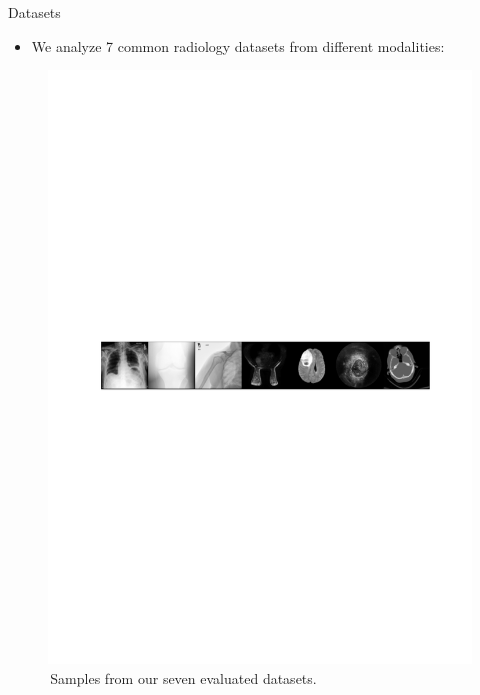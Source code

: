 \documentclass[final,hyperref={pdfpagelabels=false}]{beamer}
\begin{document}
\begin{frame}[t]
\begin{columns}[t]
\begin{column}{.47\textwidth}
\begin{block}{Datasets}
\begin{itemize}
\item We analyze 7 common radiology datasets from different modalities:
\end{itemize}
\begin{figure}
    \includegraphics[width=0.95\linewidth]{frompaper/data_eg_1row.pdf}
    \caption{\,Samples from our seven evaluated datasets.}
\end{figure}

\end{block}



\end{column}
\end{columns}
\end{frame}
\end{document}

